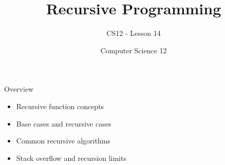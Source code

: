 \documentclass[10pt]{beamer}
\title{Recursive Programming}
\subtitle{CS12 - Lesson 14}
\author{Computer Science 12}
\date{}
\begin{document}
\begin{frame}
    \titlepage
\end{frame}

\begin{frame}{Overview}
    \begin{itemize}
        \item Recursive function concepts
        \item Base cases and recursive cases
        \item Common recursive algorithms
        \item Stack overflow and recursion limits
    \end{itemize}
\end{frame}

\end{document}
